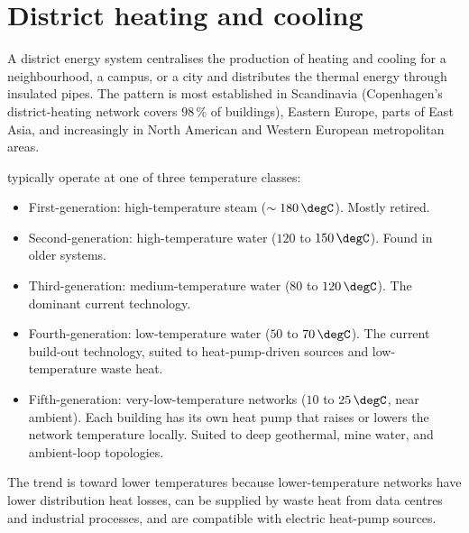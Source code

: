 \section{District heating and cooling}

A district energy system centralises the production of heating and
cooling for a neighbourhood, a campus, or a city and distributes the
thermal energy through insulated pipes. The pattern is most
established in Scandinavia (Copenhagen's district-heating network
covers $98\,\%$ of buildings), Eastern Europe, parts of East Asia,
and increasingly in North American and Western European
metropolitan areas.

 typically operate at one of three
temperature classes:

\begin{itemize}[leftmargin=*]
  \item First-generation: high-temperature steam ($\sim 180\,\degC$).
    Mostly retired.
  \item Second-generation: high-temperature water ($120$ to $150\,\degC$).
    Found in older systems.
  \item Third-generation: medium-temperature water ($80$ to $120\,\degC$).
    The dominant current technology.
  \item Fourth-generation: low-temperature water ($50$ to $70\,\degC$).
    The current build-out technology, suited to heat-pump-driven
    sources and low-temperature waste heat.
  \item Fifth-generation: very-low-temperature networks ($10$ to $25\,
    \degC$, near ambient). Each building has its own heat pump that
    raises or lowers the network temperature locally. Suited to
    deep geothermal, mine water, and ambient-loop topologies.
\end{itemize}

The trend is toward lower temperatures because lower-temperature
networks have lower distribution heat losses, can be supplied by
waste heat from data centres and industrial processes, and are
compatible with electric heat-pump sources.

